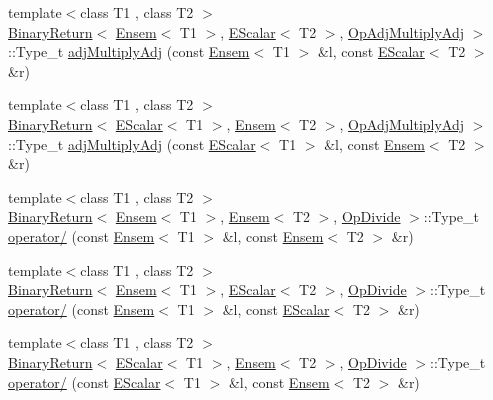 \begin{DoxyCompactItemize}
\item 
{\footnotesize template$<$class T1 , class T2 $>$ }\\\mbox{\hyperlink{structENSEM_1_1BinaryReturn}{Binary\+Return}}$<$ \mbox{\hyperlink{classENSEM_1_1Ensem}{Ensem}}$<$ T1 $>$, \mbox{\hyperlink{classENSEM_1_1EScalar}{E\+Scalar}}$<$ T2 $>$, \mbox{\hyperlink{structENSEM_1_1OpAdjMultiplyAdj}{Op\+Adj\+Multiply\+Adj}} $>$\+::Type\+\_\+t \mbox{\hyperlink{group__eensem_gac275cf78eef2b465d5278ed910042f03}{adj\+Multiply\+Adj}} (const \mbox{\hyperlink{classENSEM_1_1Ensem}{Ensem}}$<$ T1 $>$ \&l, const \mbox{\hyperlink{classENSEM_1_1EScalar}{E\+Scalar}}$<$ T2 $>$ \&r)
\item 
{\footnotesize template$<$class T1 , class T2 $>$ }\\\mbox{\hyperlink{structENSEM_1_1BinaryReturn}{Binary\+Return}}$<$ \mbox{\hyperlink{classENSEM_1_1EScalar}{E\+Scalar}}$<$ T1 $>$, \mbox{\hyperlink{classENSEM_1_1Ensem}{Ensem}}$<$ T2 $>$, \mbox{\hyperlink{structENSEM_1_1OpAdjMultiplyAdj}{Op\+Adj\+Multiply\+Adj}} $>$\+::Type\+\_\+t \mbox{\hyperlink{group__eensem_ga58683063315813c7adaca604c28f954f}{adj\+Multiply\+Adj}} (const \mbox{\hyperlink{classENSEM_1_1EScalar}{E\+Scalar}}$<$ T1 $>$ \&l, const \mbox{\hyperlink{classENSEM_1_1Ensem}{Ensem}}$<$ T2 $>$ \&r)
\item 
{\footnotesize template$<$class T1 , class T2 $>$ }\\\mbox{\hyperlink{structENSEM_1_1BinaryReturn}{Binary\+Return}}$<$ \mbox{\hyperlink{classENSEM_1_1Ensem}{Ensem}}$<$ T1 $>$, \mbox{\hyperlink{classENSEM_1_1Ensem}{Ensem}}$<$ T2 $>$, \mbox{\hyperlink{structENSEM_1_1OpDivide}{Op\+Divide}} $>$\+::Type\+\_\+t \mbox{\hyperlink{group__eensem_ga4294d59488c65a0e8cb9e552578bfd86}{operator/}} (const \mbox{\hyperlink{classENSEM_1_1Ensem}{Ensem}}$<$ T1 $>$ \&l, const \mbox{\hyperlink{classENSEM_1_1Ensem}{Ensem}}$<$ T2 $>$ \&r)
\item 
{\footnotesize template$<$class T1 , class T2 $>$ }\\\mbox{\hyperlink{structENSEM_1_1BinaryReturn}{Binary\+Return}}$<$ \mbox{\hyperlink{classENSEM_1_1Ensem}{Ensem}}$<$ T1 $>$, \mbox{\hyperlink{classENSEM_1_1EScalar}{E\+Scalar}}$<$ T2 $>$, \mbox{\hyperlink{structENSEM_1_1OpDivide}{Op\+Divide}} $>$\+::Type\+\_\+t \mbox{\hyperlink{group__eensem_ga77b1f275ee5f8d89819ec03dab4ff756}{operator/}} (const \mbox{\hyperlink{classENSEM_1_1Ensem}{Ensem}}$<$ T1 $>$ \&l, const \mbox{\hyperlink{classENSEM_1_1EScalar}{E\+Scalar}}$<$ T2 $>$ \&r)
\item 
{\footnotesize template$<$class T1 , class T2 $>$ }\\\mbox{\hyperlink{structENSEM_1_1BinaryReturn}{Binary\+Return}}$<$ \mbox{\hyperlink{classENSEM_1_1EScalar}{E\+Scalar}}$<$ T1 $>$, \mbox{\hyperlink{classENSEM_1_1Ensem}{Ensem}}$<$ T2 $>$, \mbox{\hyperlink{structENSEM_1_1OpDivide}{Op\+Divide}} $>$\+::Type\+\_\+t \mbox{\hyperlink{group__eensem_ga6a5de93e7f9569ae6390f831343a0430}{operator/}} (const \mbox{\hyperlink{classENSEM_1_1EScalar}{E\+Scalar}}$<$ T1 $>$ \&l, const \mbox{\hyperlink{classENSEM_1_1Ensem}{Ensem}}$<$ T2 $>$ \&r)

\end{DoxyCompactItemize}
